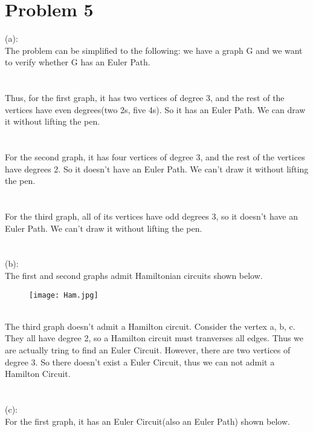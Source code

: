 \documentclass{article}
\begin{document}
\section{Problem 5}
(a):\\
The problem can be simplified to the following: we have a graph G and we want to verify whether G has an Euler Path.\\
\\ \hspace*{\fill} \\
Thus, for the first graph, it has two vertices of degree 3, and the rest of the vertices have even degrees(two 2s, five 4s). So it has an Euler Path. We can draw it without lifting the pen.\\
\\ \hspace*{\fill} \\
For the second graph, it has four vertices of degree 3, and the rest of the vertices have degrees 2. So it doesn't have an Euler Path. We can't draw it without lifting the pen.\\
\\ \hspace*{\fill} \\
For the third graph, all of its vertices have odd degrees 3, so it doesn't have an Euler Path. We can't draw it without lifting the pen.\\
\\ \hspace*{\fill} \\
(b):\\
The first and second graphs admit Hamiltonian circuits shown below.\\
\begin{figure}[H]
\centering
\texttt{[image: Ham.jpg]}
\end{figure}\\
The third graph doesn't admit a Hamilton circuit. Consider the vertex a, b, c. They all have degree 2, so a Hamilton circuit must tranverses all edges. Thus we are actually tring to find an Euler Circuit. However, there are two vertices of degree 3. So there doesn't exist a Euler Circuit, thus we can not admit a Hamilton Circuit.\\
\\ \hspace*{\fill} \\
(c):\\
For the first graph, it has an Euler Circuit(also an Euler Path) shown below.\\
\end{document}
